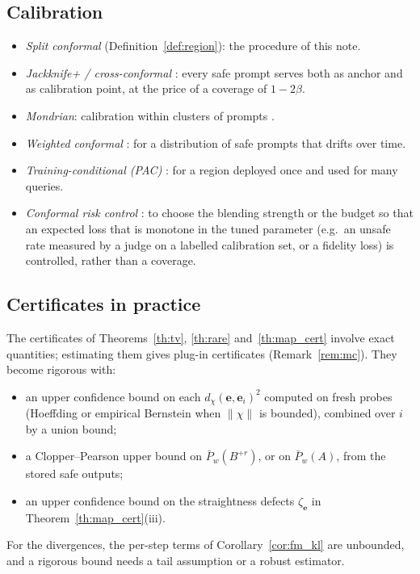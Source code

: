 \documentclass{article}
\newcommand{\Pbar}{\bar{P}}                         %
\newcommand{\be}{\mathbf{e}}                       %
\theoremstyle{plain}
\begin{document}
\subsection{Calibration}\label{subsec:calibration}
\begin{itemize}
\item \emph{Split conformal} (Definition~\ref{def:region}): the procedure of this note.
\item \emph{Jackknife+ / cross-conformal} \citep{barber2021predictive}: every safe prompt serves both as anchor
and as calibration point, at the price of a coverage of $1-2\beta$.
\item \emph{Mondrian}: calibration within clusters of prompts \citep{vovk2005algorithmic}.
\item \emph{Weighted conformal} \citep{barber2023conformal}: for a distribution of safe prompts that drifts over
time.
\item \emph{Training-conditional (PAC)} \citep{vovk2013conditional}: for a region deployed once and used for
many queries.
\item \emph{Conformal risk control} \citep{angelopoulos2024conformal}: to choose the blending strength or the
budget so that an expected loss that is monotone in the tuned parameter (e.g.\ an unsafe rate measured by a judge on a labelled calibration set,
or a fidelity loss) is controlled, rather than a coverage.
\end{itemize}

\subsection{Certificates in practice}\label{subsec:practice}
The certificates of Theorems~\ref{th:tv}, \ref{th:rare} and~\ref{th:map_cert} involve exact quantities;
estimating them gives plug-in certificates (Remark~\ref{rem:mc}). They become rigorous with:
\begin{itemize}
\item an upper confidence bound on each $d_\chi(\be,\be_i)^2$ computed on fresh probes (Hoeffding or
empirical Bernstein when $\|\chi\|$ is bounded), combined over $i$ by a union bound;
\item a Clopper--Pearson upper bound on $\Pbar_w(B^{+r})$, or on $\Pbar_w(A)$, from the stored safe outputs;
\item an upper confidence bound on the straightness defects $\zeta_{\be}$ in Theorem~\ref{th:map_cert}(iii).
\end{itemize}
For the divergences, the per-step terms of Corollary~\ref{cor:fm_kl} are unbounded, and a rigorous bound
needs a tail assumption or a robust estimator.
\end{document}

